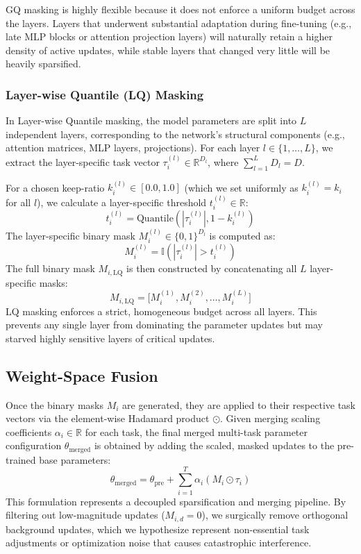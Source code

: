 GQ masking is highly flexible because it does not enforce a uniform budget across the layers. Layers that underwent substantial adaptation during fine-tuning (e.g., late MLP blocks or attention projection layers) will naturally retain a higher density of active updates, while stable layers that changed very little will be heavily sparsified.

\subsubsection{Layer-wise Quantile (LQ) Masking}
In Layer-wise Quantile masking, the model parameters are split into $L$ independent layers, corresponding to the network's structural components (e.g., attention matrices, MLP layers, projections). For each layer $l \in \{1, \dots, L\}$, we extract the layer-specific task vector $\tau_i^{(l)} \in \mathbb{R}^{D_l}$, where $\sum_{l=1}^L D_l = D$. 

For a chosen keep-ratio $k_i^{(l)} \in [0.0, 1.0]$ (which we set uniformly as $k_i^{(l)} = k_i$ for all $l$), we calculate a layer-specific threshold $t_i^{(l)} \in \mathbb{R}$:
\begin{equation}
t_i^{(l)} = \text{Quantile}(|\tau_i^{(l)}|, 1 - k_i^{(l)})
\end{equation}
The layer-specific binary mask $M_i^{(l)} \in \{0, 1\}^{D_l}$ is computed as:
\begin{equation}
M_i^{(l)} = \mathbb{I}(|\tau_i^{(l)}| > t_i^{(l)})
\end{equation}
The full binary mask $M_{i, \text{LQ}}$ is then constructed by concatenating all $L$ layer-specific masks:
\begin{equation}
M_{i, \text{LQ}} = \big[ M_i^{(1)}, M_i^{(2)}, \dots, M_i^{(L)} \big]
\end{equation}
LQ masking enforces a strict, homogeneous budget across all layers. This prevents any single layer from dominating the parameter updates but may starved highly sensitive layers of critical updates.

\subsection{Weight-Space Fusion}
Once the binary masks $M_i$ are generated, they are applied to their respective task vectors via the element-wise Hadamard product $\odot$. Given merging scaling coefficients $\alpha_i \in \mathbb{R}$ for each task, the final merged multi-task parameter configuration $\theta_{\text{merged}}$ is obtained by adding the scaled, masked updates to the pre-trained base parameters:
\begin{equation}
\theta_{\text{merged}} = \theta_{\text{pre}} + \sum_{i=1}^T \alpha_i (M_i \odot \tau_i)
\end{equation}
This formulation represents a decoupled sparsification and merging pipeline. By filtering out low-magnitude updates ($M_{i, d} = 0$), we surgically remove orthogonal background updates, which we hypothesize represent non-essential task adjustments or optimization noise that causes catastrophic interference.

